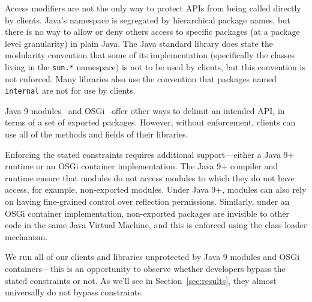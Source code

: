 
Access modifiers are not the only way to protect APIs from being
called directly by clients. Java's namespace is segregated by
hierarchical package names, but there is no way to allow or deny others access to specific packages (at a package level granularity) in plain Java. 
The Java standard library does state the modularity convention
that some of its implementation (specifically the classes living in
the \texttt{sun.*} namespace) is not to be used by clients, but this
convention is not enforced. Many libraries also use the convention that packages
named \texttt{internal} are not for use by clients. 

Java 
9 modules~\cite{corporation17:_java_platf_modul_system_jsr} and OSGi~\cite{alliance20:_osgi_core_releas_specif} offer other ways to delimit an intended API, in terms of a set of exported
packages. However, without enforcement, clients can use
all of the methods and fields of their libraries.

Enforcing the stated constraints requires additional support---either
a Java 9+ runtime or an OSGi container implementation. The Java 9+
compiler and runtime ensure that modules do not access modules to
which they do not have access, for example, non-exported modules. Under Java
9+, modules can also rely on having fine-grained control over
reflection permissions. Similarly, under an OSGi container implementation,
non-exported packages are invisible to other code in the same Java
Virtual Machine, and this is enforced using the class loader
mechanism. 

We run all of our clients and libraries unprotected by Java 9 modules
and OSGi containers---this is an opportunity to observe whether developers
bypass the stated constraints or not. As we'll see in Section~\ref{sec:results}, 
they almost universally do not bypass constraints.





